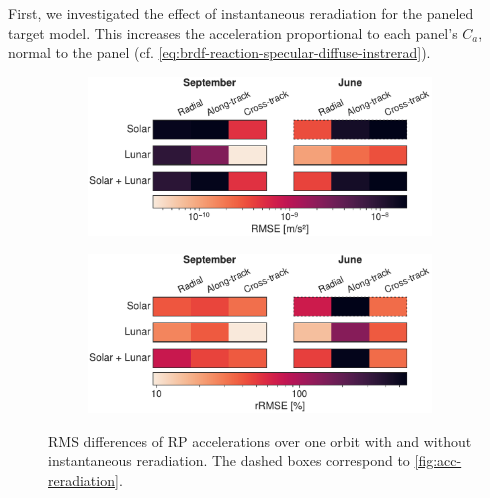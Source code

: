 First, we investigated the effect of instantaneous reradiation for the paneled target model. This increases the acceleration proportional to each panel's $C_a$, normal to the panel (cf. \cref{eq:brdf-reaction-specular-diffuse-instrerad}).

\begin{figure}[t]
    \centering
    \begin{subfigure}[c]{\linewidth}
        \includegraphics[width=\textwidth]{figures/plots/acc_reradiation_rms.pdf}
     \end{subfigure}

     \bigskip

     \begin{subfigure}[c]{\linewidth}
        \includegraphics[width=\textwidth]{figures/plots/acc_reradiation_rrms.pdf}
     \end{subfigure}
    \caption{RMS differences of \gls{RP} accelerations over one orbit with and without instantaneous reradiation. The dashed boxes correspond to \cref{fig:acc-reradiation}.}
    \label{fig:acc-reradiation-rms}
\end{figure}

